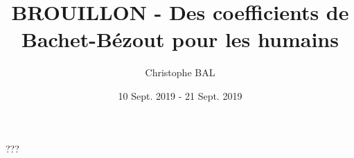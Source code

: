 \documentclass{amsbook}
\begin{document}
\title{BROUILLON - Des coefficients de Bachet-Bézout pour les humains}
\author{Christophe BAL}
\date{10 Sept. 2019 - 21 Sept. 2019}

\maketitle

???
\end{document}
